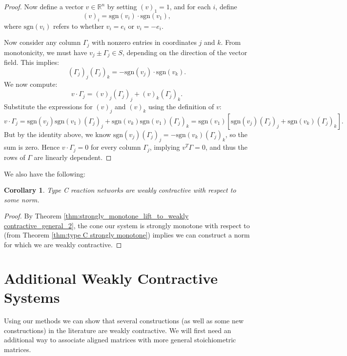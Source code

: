 \documentclass{article}
\newtheorem{cor}{Corollary}
\begin{document}
\begin{proof}
Now define a vector \( v \in \mathbb{R}^n \) by setting \( (v)_1 = 1 \), and for each \( i \), define
\[
(v)_i = \mathrm{sgn}(v_i) \cdot \mathrm{sgn}(v_1),
\]
where \( \mathrm{sgn}(v_i) \) refers to whether \( v_i = e_i \) or \( v_i = -e_i \).

Now consider any column \( \Gamma_j \) with nonzero entries in coordinates \( j \) and \( k \). From monotonicity, we must have \( v_j \pm \Gamma_j \in S \), depending on the direction of the vector field. This implies:
\[
(\Gamma_j)_j (\Gamma_j)_k = -\mathrm{sgn}(v_j) \cdot \mathrm{sgn}(v_k).
\]
We now compute:
\[
v \cdot \Gamma_j = (v)_j (\Gamma_j)_j + (v)_k (\Gamma_j)_k.
\]
Substitute the expressions for \( (v)_j \) and \( (v)_k \) using the definition of \( v \):
\[
v \cdot \Gamma_j = \mathrm{sgn}(v_j)\mathrm{sgn}(v_1)(\Gamma_j)_j + \mathrm{sgn}(v_k)\mathrm{sgn}(v_1)(\Gamma_j)_k = \mathrm{sgn}(v_1)\left[ \mathrm{sgn}(v_j)(\Gamma_j)_j + \mathrm{sgn}(v_k)(\Gamma_j)_k \right].
\]
But by the identity above, we know \( \mathrm{sgn}(v_j)(\Gamma_j)_j = -\mathrm{sgn}(v_k)(\Gamma_j)_k \), so the sum is zero. Hence \( v \cdot \Gamma_j = 0 \) for every column \( \Gamma_j \), implying \( v^T \Gamma = 0 \), and thus the rows of \( \Gamma \) are linearly dependent.
\end{proof}



 We also have the following:



\begin{cor}
\label{cor:type C is weakly contractive}
    Type C reaction networks are weakly contractive with respect to some norm. 
\end{cor}

\begin{proof}
    By Theorem \ref{thm:strongly_monotone_lift_to_weakly contractive_general_2}, the cone our system is strongly monotone with respect to (from Theorem \ref{thm:type C strongly monotone}) implies we can construct a norm for which we are weakly contractive. 
\end{proof}











\section{Additional Weakly Contractive Systems}
\label{sec:additional weakly contractive systems}
Using our methods we can show that several constructions (as well as some new constructions) in the literature are weakly contractive. We will first need an additional way to associate aligned matrices with more general stoichiometric matrices. 
\end{document}
